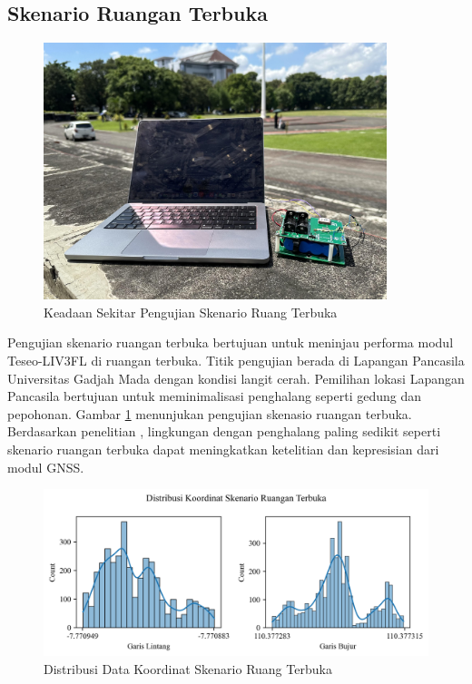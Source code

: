 \subsection{Skenario Ruangan Terbuka}
\begin{figure}[H]
	\centering
	\includegraphics[width=10cm]{contents/chapter-4/4-skenario-outdoor/keadaan.jpg}
	\caption{Keadaan Sekitar Pengujian Skenario Ruang Terbuka}
	\label{Fig: outdoor-keadaan}
\end{figure}

Pengujian skenario ruangan terbuka bertujuan untuk meninjau performa modul Teseo-LIV3FL di ruangan terbuka. Titik pengujian berada di Lapangan Pancasila Universitas Gadjah Mada dengan kondisi langit cerah. Pemilihan lokasi Lapangan Pancasila bertujuan untuk meminimalisasi penghalang seperti gedung dan pepohonan. Gambar \ref{Fig: outdoor-keadaan} menunjukan pengujian skenasio ruangan terbuka. Berdasarkan penelitian \cite{Lu2018}, lingkungan dengan penghalang paling sedikit seperti skenario ruangan terbuka dapat meningkatkan ketelitian dan kepresisian dari modul GNSS.

\begin{figure}[H]
	\centering
	\begin{adjustbox}{width=\textwidth}
		\includegraphics{contents/chapter-4/4-skenario-outdoor/distribution.png}
	\end{adjustbox}
	\caption{Distribusi Data Koordinat Skenario Ruang Terbuka}
	\label{Fig:outdoor-distribution}
\end{figure}

